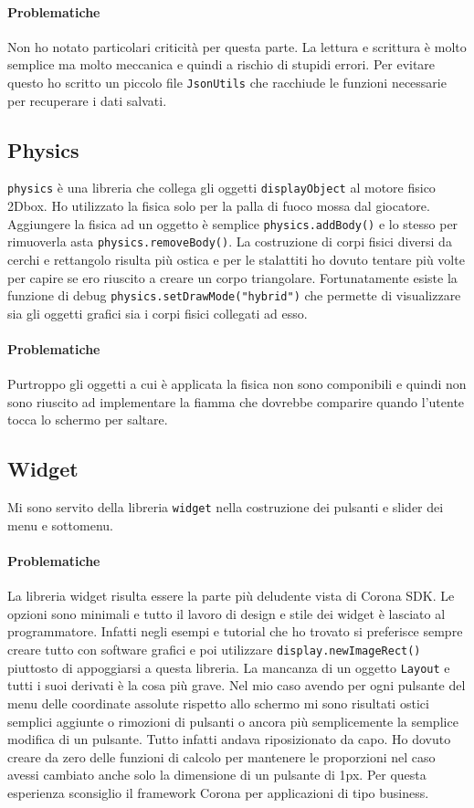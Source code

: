 		\paragraph{Problematiche}
			Non ho notato particolari criticità per questa parte. La lettura e scrittura è molto semplice ma molto meccanica e quindi a rischio di stupidi errori. Per evitare questo ho scritto un piccolo file \verb|JsonUtils| che racchiude le funzioni necessarie per recuperare i dati salvati.
		
	\subsection{Physics}
		\verb|physics| è una libreria che collega gli oggetti \verb|displayObject| al motore fisico 2Dbox. Ho utilizzato la fisica solo per la palla di fuoco mossa dal giocatore. Aggiungere la fisica ad un oggetto è semplice \verb|physics.addBody()| e lo stesso per rimuoverla asta \verb|physics.removeBody()|. La costruzione di corpi fisici diversi da cerchi e rettangolo risulta più ostica e per le stalattiti ho dovuto tentare più volte per capire se ero riuscito a creare un corpo triangolare. Fortunatamente esiste la funzione di debug \verb|physics.setDrawMode("hybrid")| che permette di visualizzare sia gli oggetti grafici sia i corpi fisici collegati ad esso.
		
		\paragraph{Problematiche}
		Purtroppo gli oggetti a cui è applicata la fisica non sono componibili e quindi non sono riuscito ad implementare la fiamma che dovrebbe comparire quando l'utente 
		tocca lo schermo per saltare.
		
	\subsection{Widget}
		Mi sono servito della libreria \verb|widget| nella costruzione dei pulsanti e slider dei menu e sottomenu. 
	
		\paragraph{Problematiche}
		La libreria widget risulta essere la parte più deludente vista di Corona SDK. Le opzioni sono minimali e tutto il lavoro di design e stile dei widget è lasciato al programmatore. Infatti negli esempi e tutorial che ho trovato si preferisce sempre creare tutto con software grafici e poi utilizzare \verb|display.newImageRect()| piuttosto di appoggiarsi a questa libreria. La mancanza di un oggetto \verb|Layout| e tutti i suoi derivati è la cosa più grave. Nel mio caso avendo per ogni pulsante del menu delle coordinate assolute rispetto allo schermo mi sono risultati ostici semplici aggiunte o rimozioni di pulsanti o ancora più semplicemente la semplice modifica di un pulsante. Tutto infatti andava riposizionato da capo. Ho dovuto creare da zero delle funzioni di calcolo per mantenere le proporzioni nel caso avessi cambiato anche solo la dimensione di un pulsante di 1px. 
		Per questa esperienza sconsiglio il framework Corona per applicazioni di tipo business.
	
